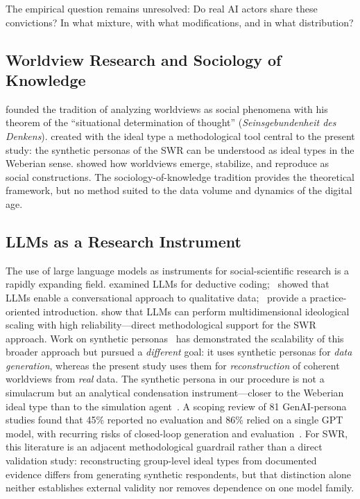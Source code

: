 \documentclass[12pt,a4paper]{article}
\begin{document}
The empirical question remains unresolved: Do real AI actors share these convictions? In what mixture, with what modifications, and in what distribution?


\subsection{Worldview Research and Sociology of Knowledge}
\label{sec:forschungsstand:wissenssoziologie}

\citet{Mannheim1929} founded the tradition of analyzing worldviews as social phenomena with his theorem of the ``situational determination of thought'' (\emph{Seinsgebundenheit des Denkens}). \citet{Weber1904} created with the ideal type a methodological tool central to the present study: the synthetic personas of the SWR can be understood as ideal types in the Weberian sense. \citet{BergerLuckmann1966} showed how worldviews emerge, stabilize, and reproduce as social constructions. The sociology-of-knowledge tradition provides the theoretical framework, but no method suited to the data volume and dynamics of the digital age.


\subsection{LLMs as a Research Instrument}
\label{sec:forschungsstand:llm}

The use of large language models as instruments for social-scientific research is a rapidly expanding field. \citet{Tai2024} examined LLMs for deductive coding;~\citet{Hayes2025} showed that LLMs enable a conversational approach to qualitative data;~\citet{NicmanisSpurrier2025} provide a practice-oriented introduction. \citet{OrnsteinEtAl2025} show that LLMs can perform multidimensional ideological scaling with high reliability---direct methodological support for the SWR approach. Work on synthetic personas~\citep{Ge2024} has demonstrated the scalability of this broader approach but pursued a \emph{different} goal: it uses synthetic personas for \emph{data generation}, whereas the present study uses them for \emph{reconstruction} of coherent worldviews from \emph{real} data. The synthetic persona in our procedure is not a simulacrum but an analytical condensation instrument---closer to the Weberian ideal type than to the simulation agent~\citep[cf.][]{Booth1961, NgRussell2000, JaraEttinger2019}. A scoping review of 81 GenAI-persona studies found that 45\% reported no evaluation and 86\% relied on a single GPT model, with recurring risks of closed-loop generation and evaluation~\citep{AminEtAl2026GenAIPersonas}. For SWR, this literature is an adjacent methodological guardrail rather than a direct validation study: reconstructing group-level ideal types from documented evidence differs from generating synthetic respondents, but that distinction alone neither establishes external validity nor removes dependence on one model family.
\end{document}
